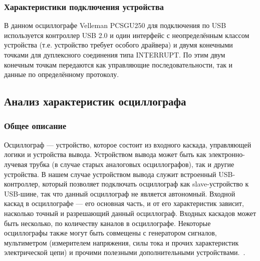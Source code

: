 \documentclass[a4paper,12pt]{report}
\numberwithin{equation}{section}
\begin{document}
\subsubsection{Характеристики подключения устройства}
В данном осциллографе Velleman PCSGU250 для подключения по USB используется
контроллер USB 2.0 и один интерфейс с неопределённым классом устройства
(т.е. устройство требует особого драйвера) и двумя конечными точками для
дуплексного соединения типа INTERRUPT. По этим двум конечным точкам передаются
как управляющие последовательности, так и данные по определённому протоколу.

\subsection{Анализ характеристик осциллографа}
\subsubsection{Общее описание}
Осциллограф --- устройство, которое состоит из входного каскада, управляющей
логики и устройства вывода. Устройством вывода может быть как электронно-лучевая
трубка (в случае старых аналоговых осциллографов), так и другие устройства. В
нашем случае устройством вывода служит встроенный USB-контроллер, который
позволяет подключать осциллограф как slave-устройство к USB-шине, так что данный
осциллограф не является автономный. Входной каскад в осциллографе --- его
основная часть, и от его характеристик зависит, насколько точный и разрешающий
данный осциллограф. Входных каскадов может быть несколько, по количеству каналов
в осциллографе. Некоторые осциллографы также могут быть совмещены с генератором
сигналов, мультиметром (измерителем напряжения, силы тока и прочих характеристик
электрической цепи) и прочими полезными дополнительными
устройствами.~\cite{лозицкий1976электрорадио}.
\end{document}
